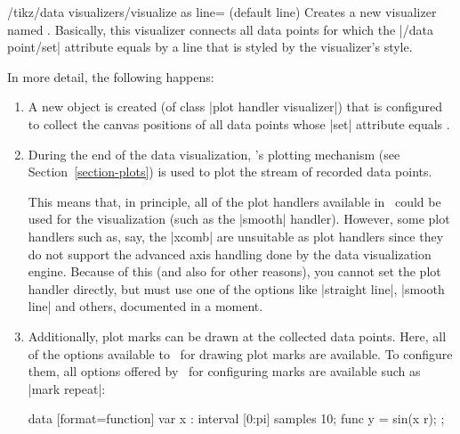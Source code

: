 \begin{key}{/tikz/data visualizers/visualize as line= (default line)}
    Creates a new visualizer named . Basically, this
    visualizer connects all data points for which the |/data point/set|
    attribute equals  by a line that is styled by the
    visualizer's style.

    In more detail, the following happens:
    \begin{enumerate}
        \item A new object is created (of class |plot handler visualizer|) that
            is configured to collect the canvas positions of all data points
            whose |set| attribute equals .
        \item During the end of the data visualization, \pgfname's plotting
            mechanism (see Section~\ref{section-plots}) is used to plot the
            stream of recorded data points.

            This means that, in principle, all of the plot handlers available
            in \tikzname\ could be used for the visualization (such as the
            |smooth| handler). However, some plot handlers such as, say, the
            |xcomb| are unsuitable as plot handlers since they do not support
            the advanced axis handling done by the data visualization engine.
            Because of this (and also for other reasons), you cannot set the
            plot handler directly, but must use one of the options like
            |straight line|, |smooth line| and others, documented in a moment.
        \item Additionally, plot marks can be drawn at the collected data
            points. Here, all of the options available to \tikzname\ for
            drawing plot marks are available. To configure them, all options
            offered by \tikzname\ for  configuring marks are available such as
            |mark repeat|:
\begin{codeexample}[
    width=7cm,
    preamble={\usetikzlibrary{datavisualization.formats.functions}},
]
\tikz \datavisualization
 [scientific axes=clean,
  visualize as line=my data,
  my data={style={mark=x, mark repeat=3}}]
data [format=function] {
  var x : interval [0:pi] samples 10;
  func y = sin(\value x r);
};
\end{codeexample}
    \end{enumerate}


\end{key}
